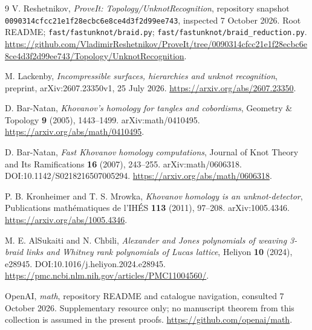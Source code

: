 \documentclass[11pt]{article}
\theoremstyle{definition}
\theoremstyle{remark}
\begin{document}
\clearpage
\begin{thebibliography}{9}
V. Reshetnikov, \emph{ProveIt: Topology/UnknotRecognition}, repository snapshot
\texttt{0090314cfcc21e1f28ecbc6e8ce4d3f2d99ee743}, inspected 7 October 2026.
Root README; \texttt{fast/fastunknot/braid.py};
\texttt{fast/fastunknot/braid\_reduction.py}.
\url{https://github.com/VladimirReshetnikov/ProveIt/tree/0090314cfcc21e1f28ecbc6e8ce4d3f2d99ee743/Topology/UnknotRecognition}.

M. Lackenby, \emph{Incompressible surfaces, hierarchies and unknot recognition},
preprint, arXiv:2607.23350v1, 25 July 2026.
\url{https://arxiv.org/abs/2607.23350}.

D. Bar-Natan, \emph{Khovanov's homology for tangles and cobordisms},
Geometry \& Topology \textbf{9} (2005), 1443--1499.
arXiv:math/0410495.
\url{https://arxiv.org/abs/math/0410495}.

D. Bar-Natan, \emph{Fast Khovanov homology computations},
Journal of Knot Theory and Its Ramifications \textbf{16} (2007), 243--255.
arXiv:math/0606318. DOI:10.1142/S0218216507005294.
\url{https://arxiv.org/abs/math/0606318}.

P. B. Kronheimer and T. S. Mrowka,
\emph{Khovanov homology is an unknot-detector},
Publications math\'ematiques de l'IH\'ES \textbf{113} (2011), 97--208.
arXiv:1005.4346.
\url{https://arxiv.org/abs/1005.4346}.

M. E. AlSukaiti and N. Chbili,
\emph{Alexander and Jones polynomials of weaving 3-braid links and Whitney
rank polynomials of Lucas lattice}, Heliyon \textbf{10} (2024), e28945.
DOI:10.1016/j.heliyon.2024.e28945.
\url{https://pmc.ncbi.nlm.nih.gov/articles/PMC11004560/}.

OpenAI, \emph{math}, repository README and catalogue navigation,
consulted 7 October 2026. Supplementary resource only; no manuscript theorem
from this collection is assumed in the present proofs.
\url{https://github.com/openai/math}.
\end{thebibliography}
\end{document}
